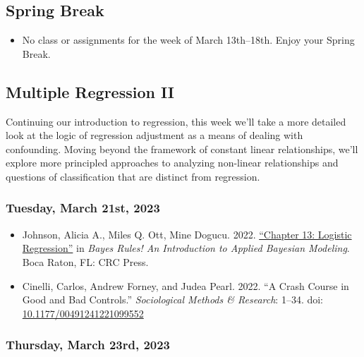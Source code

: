 \documentclass[12pt,]{article}
\providecommand{\tightlist}{%
  \setlength{\itemsep}{0pt}\setlength{\parskip}{0pt}}
\begin{document}
\hypertarget{spring-break}{%
\subsection{Spring Break}\label{spring-break}}

\begin{itemize}
\tightlist
\item
  No class or assignments for the week of March 13th--18th. Enjoy your
  Spring Break.
\end{itemize}

\hypertarget{multiple-regression-ii}{%
\subsection{Multiple Regression II}\label{multiple-regression-ii}}

\noindent Continuing our introduction to regression, this week we'll
take a more detailed look at the logic of regression adjustment as a
means of dealing with confounding. Moving beyond the framework of
constant linear relationships, we'll explore more principled approaches
to analyzing non-linear relationships and questions of classification
that are distinct from regression.

\hypertarget{tuesday-march-21st-2023}{%
\subsubsection{Tuesday, March 21st,
2023}\label{tuesday-march-21st-2023}}

\begin{itemize}
\item
  Johnson, Alicia A., Miles Q. Ott, Mine Dogucu. 2022.
  \href{https://www.bayesrulesbook.com/chapter-13.html}{``Chapter 13:
  Logistic Regression''} in \emph{Bayes Rules! An Introduction to
  Applied Bayesian Modeling}. Boca Raton, FL: CRC Press.
\item
  Cinelli, Carlos, Andrew Forney, and Judea Pearl. 2022. ``A Crash
  Course in Good and Bad Controls.'' \emph{Sociological Methods \&
  Research}: 1--34. doi:
  \href{https://doi.org/10.1177/00491241221099552}{10.1177/00491241221099552}
\end{itemize}

\hypertarget{thursday-march-23rd-2023}{%
\subsubsection{Thursday, March 23rd,
2023}\label{thursday-march-23rd-2023}}
\end{document}
